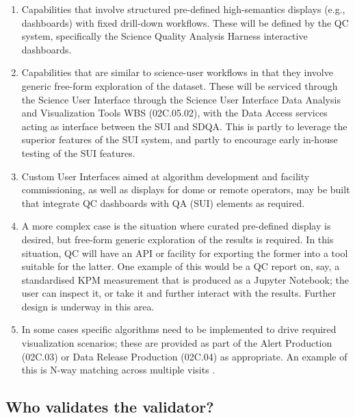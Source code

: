 \documentclass[DM,toc,lsstdraft]{lsstdoc}
\begin{document}
\begin{enumerate}

\item Capabilities that involve structured pre-defined high-semantics displays (e.g., dashboards) with fixed drill-down workflows. These will be defined by the QC system, specifically the Science Quality Analysis Harness interactive dashboards.

\item Capabilities that are similar to science-user workflows in that they involve generic free-form exploration of the dataset. These will be serviced through the Science User Interface through the Science User Interface Data Analysis and Visualization Tools WBS (02C.05.02), with the Data Access services acting as interface between the SUI and SDQA. This is partly to leverage the superior features of the SUI system, and partly to encourage early in-house testing of the SUI features.

\item Custom User Interfaces aimed at algorithm development and facility commissioning, as well as displays for dome or remote operators, may be built that integrate QC dashboards with QA (SUI) elements as required.

\item A more complex case is the situation where curated pre-defined display is desired, but free-form generic exploration of the results is required. In this situation, QC will have an API or facility for exporting the former into a tool suitable for the latter. One example of this would be a QC report on, say, a standardised KPM measurement that is produced as a Jupyter Notebook; the user can inspect it, or take it and further interact with the results. Further design is underway in this area.

\item In some cases specific algorithms need to be implemented to drive required visualization scenarios; these are provided as part of the Alert Production (02C.03) or Data Release Production (02C.04) as appropriate. An example of this is N-way matching across multiple visits .

\end{enumerate}

\subsection{Who validates the validator?}
\label{sec:qaSelfValidation}
\end{document}
